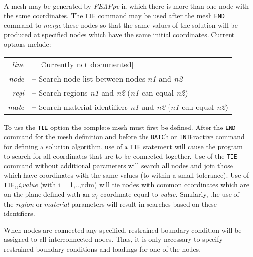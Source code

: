  \\{\smallskip}
 \\{\smallskip}
 \\{\smallskip}
 \\{\smallskip}
 \\{\smallskip}
 \\{\smallskip}
\headb

A mesh may be generated by {\sl FEAPpv} in which there is more
than one node with the same coordinates.  The {\tt TIE} command
may be used after the mesh {\tt END} command
to {\it merge} these nodes so that the same values
of the solution will be produced at specified nodes which have the same
initial coordinates. Current options include:

\begin{center}
\begin{tabular}{r l}
\it line &-- [Currently not documented] \\
\it node &-- Search node list between nodes {\it n1} and {\it n2} \\
\it regi &-- Search regions {\it n1} and {\it n2} ({\it n1}
can equal {\it n2}) \\
\it mate &-- Search material identifiers {\it n1} and {\it n2} ({\it n1}
can equal {\it n2}) \\
\end{tabular}
\end{center}
\noindent
To use the {\tt TIE} option the complete mesh must first be
defined.  After the {\tt END} command for the mesh definition
and before the {\tt BATC}h or {\tt INTE}ractive command
for defining a solution algorithm, use of a {\tt TIE} statement
will cause the program to search for all coordinates
that are to be connected together.  Use of the {\tt TIE} command
without additional parameters will search all nodes and join
those which have coordinates with the same values (to within a
small tolerance).  Use of {\tt TIE},,{\it i,value} (with i = 1,..,ndm)
will tie nodes with common coordinates which are on the
plane defined with an $x_i$ coordinate equal to {\it value}.
Similarly, the use of the {\it region} or {\it material} parameters
will result in searches based on these identifiers.

When nodes are connected any specified, restrained
boundary condition will be assigned to all interconnected
nodes.  Thus, it is only necessary to specify restrained
boundary conditions and loadings for one of the nodes.
\vfil\eject
